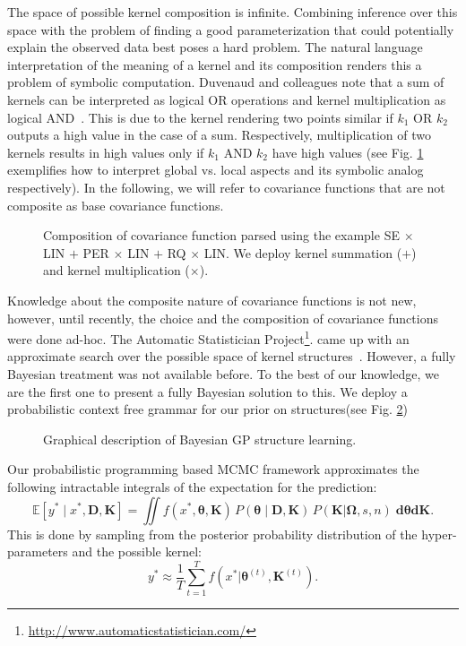 The space of possible kernel composition is infinite. Combining inference over this space with the problem of finding a good parameterization that could potentially explain the observed data best poses a hard problem. The natural language interpretation of the meaning of a kernel and its composition renders this a problem of symbolic computation. Duvenaud and colleagues note that a sum of kernels can be interpreted as logical OR operations and kernel multiplication as logical AND~\citeyearpar{duvenaud2013structure}. This is due to the kernel rendering two points similar if $k_1$ OR $k_2$ outputs a high value in the case of a sum. Respectively, multiplication of two kernels results in high values only if $k_1$ AND $k_2$ have high values (see Fig. \ref{fig:composite} exemplifies how to interpret global vs. local aspects and its symbolic analog respectively). 
In the following, we will refer to covariance functions that are not composite as base covariance functions.

\begin{figure}
\centering

\caption{Composition of covariance function parsed using the example SE $\times$ LIN $+$ PER $\times$ LIN $+$  RQ $\times$ LIN. We deploy kernel summation ($+$) and kernel multiplication ($\times$).}\label{fig:composite}
\end{figure}


Knowledge about the composite nature of covariance functions is not new, however, until recently, the choice and the composition of covariance functions were done ad-hoc. The Automatic Statistician Project\footnote{\url{http://www.automaticstatistician.com/}}. came up with an approximate search over the possible space of kernel structures~\citep{duvenaud2013structure,lloyd2014automatic}. However, a fully Bayesian treatment was not available before. To the best of our knowledge, we are the first one to present a fully Bayesian solution to this. We deploy a probabilistic context free grammar for our prior on structures(see Fig. \ref{fig:schema})
\begin{figure}
\centering

\caption{Graphical description of Bayesian GP structure learning.}\label{fig:schema}
\end{figure}


Our probabilistic programming based MCMC framework approximates the following intractable integrals of the expectation for the prediction:
\begin{equation}
\mathbb{E}[y^* \mid x^*,\mathbf{D},\mathbf{K}] =\iint f(x^*,\bm{\theta},\mathbf{K})\,P(\bm{\theta} \mid \mathbf{D,\mathbf{K}})\,P(\mathbf{K}|\bm{\Omega},s,n) \; \mathbf{d} \bm{\theta} \mathbf{d} \mathbf{K}.  
\end{equation}
This is done by sampling from the posterior probability distribution of the hyper-parameters and the possible kernel:
\begin{equation}
y^* \approx \frac{1}{T} \sum^T_{t=1} f(x^* | \bm{\theta}^{(t)},\mathbf{K}^{(t)}). 
\end{equation}


